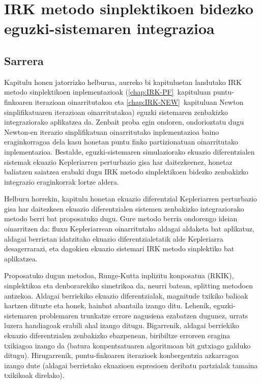 \chapter{IRK metodo sinplektikoen bidezko eguzki-sistemaren  integrazioa}


\section{Sarrera}

Kapitulu honen jatorrizko helburua, aurreko  bi kapituluetan landutako IRK metodo sinplektikoen inplementazioak (\ref{chap:IRK-PF}~kapituluan puntu-finkoaren iterazioan oinarritutakoa eta \ref{chap:IRK-NEW}~kapituluan Newton sinplifikatuaren iterazioan oinarritutakoa) eguzki sistemaren zenbakizko integraziorako aplikatzea da.  Zenbait proba egin ondoren, ondorioztatu dugu Newton-en iterazio sinplifikatuan oinarritutako inplementazioa baino eraginkorragoa dela kasu  honetan puntu finko partizionatuan oinarritutako inplementazioa. Bestalde, eguzki-sistemaren simulaziorako ekuazio diferentzialen sistemak ekuazio Kepleriarren perturbazio gisa har daitezkeenez, honetaz baliatzen saiatzea erabaki dugu IRK metodo sinplektikoen bidezko zenbakizko integrazio eraginkorrak lortze aldera.

Helburu horrekin,  kapitulu honetan ekuazio diferentzial Kepleriarren perturbazio gisa har daitezkeen ekuazio diferentzialen sistemen zenbakizko integraziorako metodo berri bat proposatuko dugu. Gure metodo berria ondorengo ideian  oinarritzen da: fluxu Kepleriarrean oinarritutako aldagai aldaketa bat aplikatuz, aldagai berrietan idatzitako ekuazio diferentzialetatik alde Kepleriarra desagerrarazi, eta dagokien ekuazio sistemari IRK metodo sinplektiko bat aplikatzea.



Proposatuko dugun metodoa, Runge-Kutta inplizitu konposatua (RKIK),  sinplektikoa eta denborarekiko simetrikoa da, neurri batean, splitting metodoen antzekoa. Aldagai berriekiko ekuazio diferentzialak, magnitude txikiko balioak hartzen dituzte eta honek, hainbat abantaila izango ditu. Lehenik, eguzki-sistemaren problemaren trunkatze errore nagusiena ezabatzen dugunez, urrats luzera handiagoak erabili ahal izango ditugu. Bigarrenik, aldagai berriekiko ekuazio diferentzialen zenbakizko ebazpenean, biribiltze erroreen eragina txikiagoa izango da (batura konpentsatuaren algoritmoan bit gutxiago galduko ditugu). Hirugarrenik, puntu-finkoaren iterazioek konbergentzia azkarragoa izango dute (aldagai berrietako ekuazioen espresioen deribatu partzialak tamaina txikikoak direlako).


